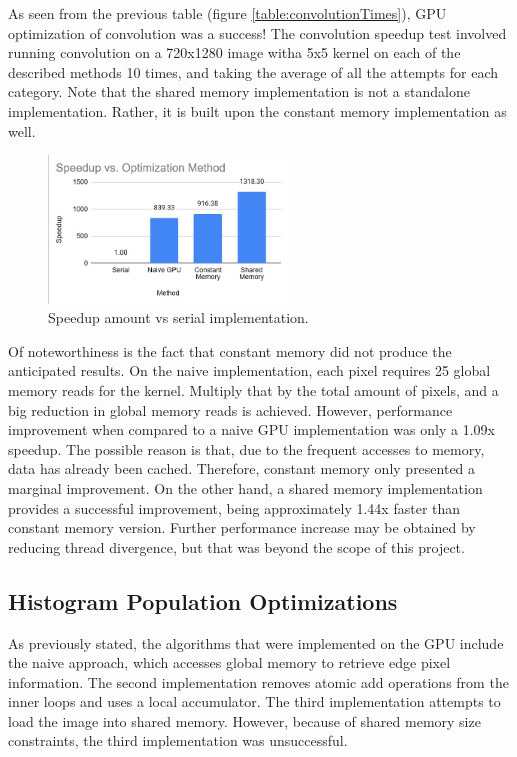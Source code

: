 \documentclass[12pt]{article}
\begin{document}
As seen from the previous table (figure \ref{table:convolutionTimes}), GPU optimization of convolution was a success! The convolution speedup test involved running convolution on a 720x1280 image witha 5x5 kernel on each of the described methods 10 times, and taking the average of all the attempts for each category. Note that the shared memory implementation is not a standalone implementation. Rather, it is built upon the constant memory implementation as well. 
\begin{figure}
\centering
\includegraphics[width=2.5in]{figures/ConvolutionSpeedup}\caption{Speedup amount vs serial implementation.}\label{figure:convolution-speedup}
\end{figure}
Of noteworthiness is the fact that constant memory did not produce the anticipated results. On the naive implementation, each pixel requires 25 global memory reads for the kernel. Multiply that by the total amount of pixels, and a big reduction in global memory reads is achieved. However, performance improvement when compared to a naive GPU implementation was only a 1.09x speedup. The possible reason is that, due to the frequent accesses to memory, data has already been cached. Therefore, constant memory only presented a marginal improvement. 
On the other hand, a shared memory implementation provides a successful improvement, being approximately 1.44x faster than constant memory version. Further performance increase may be obtained by reducing thread divergence, but that was beyond the scope of this project.

\subsection{Histogram Population Optimizations}
As previously stated, the algorithms that were implemented on the GPU include the naive approach, which accesses global memory to retrieve edge pixel information.
The second implementation removes atomic add operations from the inner loops and uses a local accumulator.
The third implementation attempts to load the image into shared memory. However, because of shared memory size constraints, the third implementation was unsuccessful.
\end{document}
